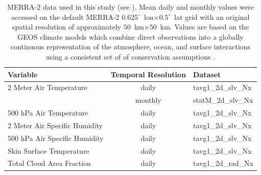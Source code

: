 \documentclass[11pt]{report}
\begin{document}
\begin{table}[!h]
\begin{center}
\begin{tabular}{ |l|c|l| } 
\hline
\bfseries{Variable} & \bfseries{Temporal Resolution} & \bfseries{Dataset}\\
\hline
2 Meter Air Temperature 			& daily 	&  tavg1\_2d\_slv\_Nx\\ 
									& monthly 	&  statM\_2d\_slv\_Nx\\
500 hPa Air Temperature 			& daily 	&  tavg1\_2d\_slv\_Nx\\ 
2 Meter Air Specific Humidity 		& daily 	& tavg1\_2d\_slv\_Nx \\ 
500 hPa Air Specific Humidity 		& daily 	& tavg1\_2d\_slv\_Nx \\ 
Skin Surface Temperature 			& daily 	& tavg1\_2d\_slv\_Nx \\ 
Total Cloud	Area Fraction			& daily 	& tavg1\_2d\_rad\_Nx \\
\hline
\end{tabular}
\caption[MERRA-2 Data]{MERRA-2 data used in this study (see ). Mean daily and monthly values were accessed on the default MERRA-2 $0.625^{\circ}$~lon$\times0.5^{\circ}$~lat grid with an original spatial resolution of approximately $50$~km$\times50$~km\cite[][]{bosilovich2016}. Values are based on the GEOS climate models which combine direct observations into a globally continuous representation of the atmosphere, ocean, and surface interactions using a consistent set of of conservation assumptions \cite[][]{gelaro2017,bosilovich2016}. \label{tab:merradata}}
\end{center}
\end{table}
\end{document}
